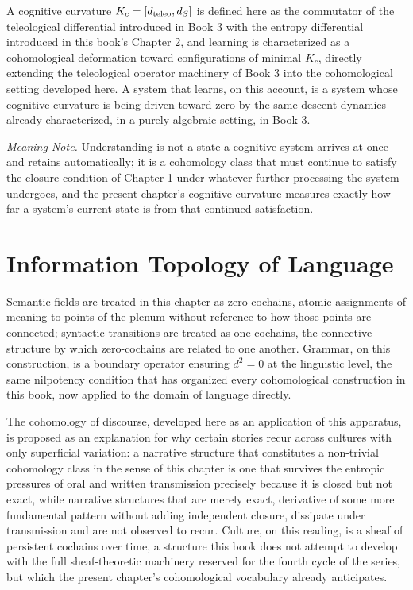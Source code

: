 A cognitive curvature $K_c = [d_{\mathrm{teleo}}, d_{S}]$ is defined here as the commutator of the teleological differential introduced in Book 3 with the entropy differential introduced in this book's Chapter 2, and learning is characterized as a cohomological deformation toward configurations of minimal $K_c$, directly extending the teleological operator machinery of Book 3 into the cohomological setting developed here. A system that learns, on this account, is a system whose cognitive curvature is being driven toward zero by the same descent dynamics already characterized, in a purely algebraic setting, in Book 3.

\emph{Meaning Note.} Understanding is not a state a cognitive system arrives at once and retains automatically; it is a cohomology class that must continue to satisfy the closure condition of Chapter 1 under whatever further processing the system undergoes, and the present chapter's cognitive curvature measures exactly how far a system's current state is from that continued satisfaction.

\chapter{Information Topology of Language}

Semantic fields are treated in this chapter as zero-cochains, atomic assignments of meaning to points of the plenum without reference to how those points are connected; syntactic transitions are treated as one-cochains, the connective structure by which zero-cochains are related to one another. Grammar, on this construction, is a boundary operator ensuring $d^2 = 0$ at the linguistic level, the same nilpotency condition that has organized every cohomological construction in this book, now applied to the domain of language directly.

The cohomology of discourse, developed here as an application of this apparatus, is proposed as an explanation for why certain stories recur across cultures with only superficial variation: a narrative structure that constitutes a non-trivial cohomology class in the sense of this chapter is one that survives the entropic pressures of oral and written transmission precisely because it is closed but not exact, while narrative structures that are merely exact, derivative of some more fundamental pattern without adding independent closure, dissipate under transmission and are not observed to recur. Culture, on this reading, is a sheaf of persistent cochains over time, a structure this book does not attempt to develop with the full sheaf-theoretic machinery reserved for the fourth cycle of the series, but which the present chapter's cohomological vocabulary already anticipates.

